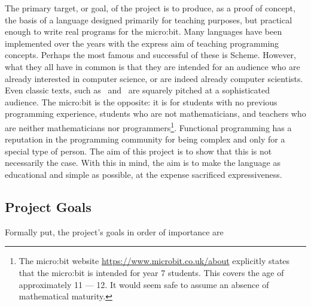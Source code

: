 \documentclass[12pt, a4paper]{report}
\begin{document}
The primary target, or goal, of the project is to produce, as a proof of concept, the basis of a
language designed primarily for teaching purposes, but practical enough to write real programs for
the micro:bit. Many languages have been implemented over the years with the express aim of teaching
programming concepts. Perhaps the most famous and successful of these is Scheme. However, what they
all have in common is that they are intended for an audience who are already interested in computer
science, or are indeed already computer scientists. Even classic texts, such
as~\cite{Abelson:1996:SIC:547755} and~\cite{Friedman1900} are squarely pitched at a sophisticated audience.
The micro:bit is the opposite: it is for students with no previous programming experience,
students who are not mathematicians, and teachers who are neither mathematicians nor
programmers\footnote{The micro:bit website \url{https://www.microbit.co.uk/about} explicitly states
that the micro:bit is intended for year 7 students. This covers the age of approximately 11 --- 12. It
would seem safe to assume an absence of mathematical maturity.}.
Functional programming has a reputation in the programming community for being complex and only for a
special type of person. The aim of this project is to show that this is not necessarily the case.
With this in mind, the aim is to make the language as educational and simple as possible, at the expense 
sacrificed expressiveness. 

\subsection{Project Goals}
Formally put, the project's goals in order of importance are 
\end{document}
